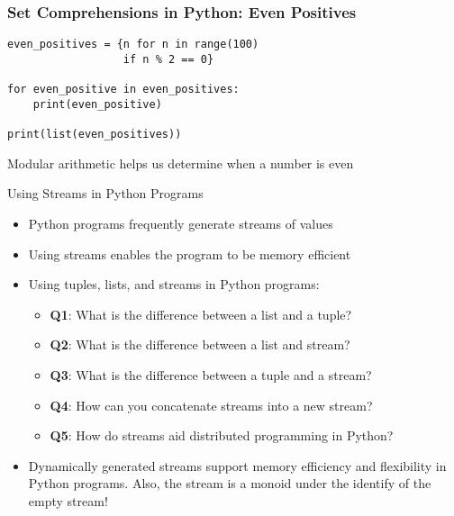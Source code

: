 \documentclass[14pt,aspectratio=169]{beamer}
\begin{document}
%
\begin{frame}[fragile]
  \frametitle{Set Comprehensions in Python: Even Positives}
  \normalsize
  \begin{minipage}{6in}
    \vspace*{.25in}
    \begin{verbatim}
even_positives = {n for n in range(100)
                  if n % 2 == 0}

for even_positive in even_positives:
    print(even_positive)

print(list(even_positives))
    \end{verbatim}
  \end{minipage}
  \vspace*{.05in}
  \begin{center}
    \normalsize \noindent Modular arithmetic helps us determine when a number is
    even\\
  \end{center}
\end{frame}

%
\begin{frame}{Using Streams in Python Programs}
  \begin{itemize}
    \item Python programs frequently generate streams of values
      \vspace*{-.2in}
    \item Using streams enables the program to be memory efficient
      \vspace*{-.2in}
    \item Using tuples, lists, and streams in Python programs:
      \begin{itemize}
        \item {\bf Q1}: What is the difference between a list and a tuple?
        \item {\bf Q2}: What is the difference between a list and stream?
        \item {\bf Q3}: What is the difference between a tuple and a stream?
        \item {\bf Q4}: How can you concatenate streams into a new stream?
        \item {\bf Q5}: How do streams aid distributed programming in Python?
      \end{itemize}
      \vspace*{-.2in}
    \item Dynamically generated streams support memory efficiency and
      flexibility in Python programs. Also, the stream is a monoid under the
      identify of the empty stream!
  \end{itemize}
\end{frame}
\end{document}
